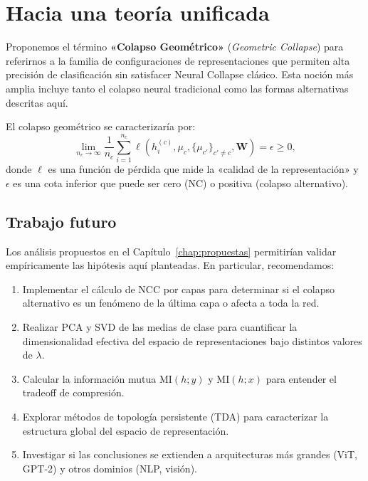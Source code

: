 \documentclass[12pt,a4paper]{report}
\newcommand{\MI}{\text{MI}}
\begin{document}
\section{Hacia una teoría unificada}

Proponemos el término \textbf{«Colapso Geométrico»} (\emph{Geometric Collapse}) para referirnos a la familia de configuraciones de representaciones que permiten alta precisión de clasificación sin satisfacer Neural Collapse clásico. Esta noción más amplia incluye tanto el colapso neural tradicional como las formas alternativas descritas aquí.

El colapso geométrico se caracterizaría por:
\begin{equation}
    \lim_{n_c \to \infty} \frac{1}{n_c}\sum_{i=1}^{n_c} \ell\!\left(h_i^{(c)}, \mu_c, \{\mu_{c'}\}_{c' \neq c}, \mathbf{W}\right) = \epsilon \geq 0,
\end{equation}
donde $\ell$ es una función de pérdida que mide la «calidad de la representación» y $\epsilon$ es una cota inferior que puede ser cero (NC) o positiva (colapso alternativo).

\subsection{Trabajo futuro}

Los análisis propuestos en el Capítulo~\ref{chap:propuestas} permitirían validar empíricamente las hipótesis aquí planteadas. En particular, recomendamos:

\begin{enumerate}
    \item Implementar el cálculo de NCC por capas para determinar si el colapso alternativo es un fenómeno de la última capa o afecta a toda la red.

    \item Realizar PCA y SVD de las medias de clase para cuantificar la dimensionalidad efectiva del espacio de representaciones bajo distintos valores de $\lambda$.

    \item Calcular la información mutua $\MI(h; y)$ y $\MI(h; x)$ para entender el tradeoff de compresión.

    \item Explorar métodos de topología persistente (TDA) para caracterizar la estructura global del espacio de representación.

    \item Investigar si las conclusiones se extienden a arquitecturas más grandes (ViT, GPT-2) y otros dominios (NLP, visión).
\end{enumerate}
\end{document}
